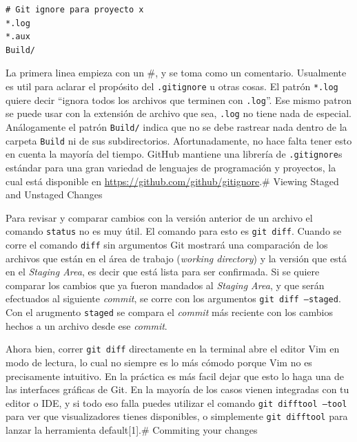 \documentclass[spanish, 12pt, a4paper]{article}
\begin{document}
\begin{lstlisting}
# Git ignore para proyecto x
*.log
*.aux
Build/
\end{lstlisting}

La primera linea empieza con un \#, y se toma como un comentario.
Usualmente es util para aclarar el propósito del
\passthrough{\lstinline!.gitignore!} u otras cosas. El patrón
\passthrough{\lstinline!*.log!} quiere decir ``ignora todos los archivos
que terminen con \passthrough{\lstinline!.log!}''. Ese mismo patron se
puede usar con la extensión de archivo que sea,
\passthrough{\lstinline!.log!} no tiene nada de especial. Análogamente
el patrón \passthrough{\lstinline!Build/!} indica que no se debe
rastrear nada dentro de la carpeta \passthrough{\lstinline!Build!} ni de
sus subdirectorios. Afortunadamente, no hace falta tener esto en cuenta
la mayoría del tiempo. GitHub mantiene una librería de
\passthrough{\lstinline!.gitignore!}s estándar para una gran variedad de
lenguajes de programación y proyectos, la cual está disponible en
\url{https://github.com/github/gitignore}.\# Viewing Staged and Unstaged
Changes

Para revisar y comparar cambios con la versión anterior de un archivo el
comando \passthrough{\lstinline!status!} no es muy útil. El comando para
esto es \passthrough{\lstinline!git diff!}. Cuando se corre el comando
\passthrough{\lstinline!diff!} sin argumentos Git mostrará una
comparación de los archivos que están en el área de trabajo
(\emph{working directory}) y la versión que está en el \emph{Staging
Area}, es decir que está lista para ser confirmada. Si se quiere
comparar los cambios que ya fueron mandados al \emph{Staging Area}, y
que serán efectuados al siguiente \emph{commit}, se corre con los
argumentos \passthrough{\lstinline!git diff –staged!}. Con el arugmento
\passthrough{\lstinline!staged!} se compara el \emph{commit} más
reciente con los cambios hechos a un archivo desde ese \emph{commit}.

Ahora bien, correr \passthrough{\lstinline!git diff!} directamente en la
terminal abre el editor Vim en modo de lectura, lo cual no siempre es lo
más cómodo porque Vim no es precisamente intuitivo. En la práctica es
más facil dejar que esto lo haga una de las interfaces gráficas de Git.
En la mayoría de los casos vienen integradas con tu editor o IDE, y si
todo eso falla puedes utilizar el comando
\passthrough{\lstinline!git difftool –tool!} para ver que visualizadores
tienes disponibles, o simplemente \passthrough{\lstinline!git difftool!}
para lanzar la herramienta default{[}1{]}.\# Commiting your changes
\end{document}
